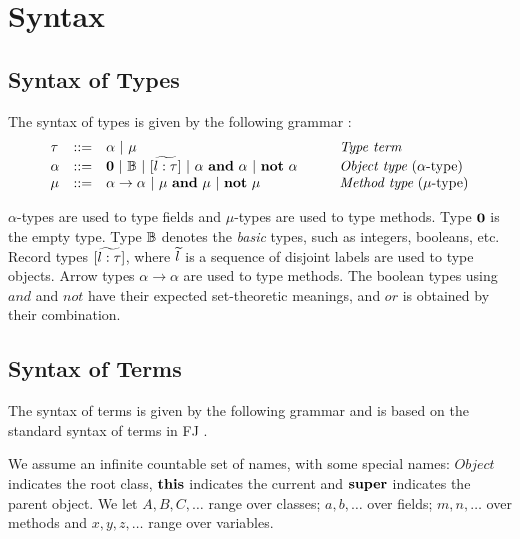 \documentclass{l4proj}
\begin{document}
\section{Syntax}

\subsection{Syntax of Types}

\label{sec:design}
The syntax of types is given by the following grammar \citep{Dardha2013,Dardha2017}:
$$
    \begin{array}{llll}
        \tau   & ::=                                       & \alpha \ |\ \mu
               & \mbox{{\em Type term}}
        \\
        \alpha & ::=                                       & \zero \ |\ \btypes \ |\ [\wt{l:\tau}] \ |\ \alpha \ \bf{and}\ \alpha \ |\ \bf{not}\ \alpha
        \qquad
               & \mbox{{\em Object type} ($\alpha $-type)}
        \\
        \mu    & ::=                                       & \alpha \to \alpha \ |\ \mu \ \bf{and}\ \mu \ |\ \bf{not}\ \mu
               & \mbox{{\em Method type} ($\mu $-type)}
    \end{array}
$$

$\alpha$-types are used to type fields and $\mu$-types are used to type methods.
Type $\mathbf{0}$ is the empty type.
Type ${\mathbb B}$ denotes the \emph{basic} types, such as integers, booleans, etc.
    {Record} types $[\widetilde{l:\tau}]$, where $\widetilde{l}$ is a sequence of disjoint labels are used to type objects.
Arrow types $\alpha \to \alpha$ are used to type methods.
The boolean types using ${and}$ and ${not}$ have their expected set-theoretic meanings, and ${or}$ is obtained by their combination.\\

\subsection{Syntax of Terms}

The syntax of terms is given by the following grammar and is based on the standard syntax of terms in FJ \cite{Igarashi1999,Dardha2013,Dardha2017}.

We assume an infinite countable set of names, with some special names: $\mathit{Object}$ indicates the root class, $\mathbf{this}$  indicates the current and $\mathbf{super}$ indicates the parent object.
We let  $A, B, C, \ldots$ range over classes; $a, b, \ldots$ over fields; $m, n, \ldots$ over methods and $x, y, z, \ldots$ range over variables.
\end{document}
